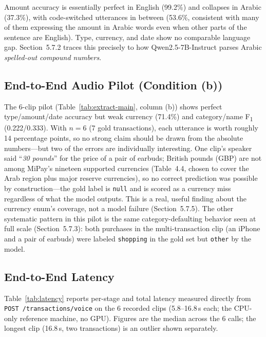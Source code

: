 Amount accuracy is essentially perfect in English (99.2\%) and collapses in
Arabic (37.3\%), with code-switched utterances in between (53.6\%, consistent
with many of them expressing the amount in Arabic words even when other parts
of the sentence are English). Type, currency, and date show no comparable
language gap. Section~5.7.2 traces this precisely to how Qwen2.5-7B-Instruct
parses Arabic \emph{spelled-out compound numbers}.

\subsection{End-to-End Audio Pilot (Condition (b))}

The 6-clip pilot (Table~\ref{tab:extract-main}, column (b)) shows perfect
type/amount/date accuracy but weak currency (71.4\%) and category/name
F\textsubscript{1} (0.222/0.333). With $n=6$ (7 gold transactions), each
utterance is worth roughly 14 percentage points, so no strong claim should be
drawn from the absolute numbers---but two of the errors are individually
interesting. One clip's speaker said ``\emph{30 pounds}'' for the price of a
pair of earbuds; British pounds (GBP) are not among MiPay's nineteen supported
currencies (Table~4.4, chosen to cover the Arab region plus major reserve
currencies), so no correct prediction was possible by construction---the gold
label is \texttt{null} and is scored as a currency miss regardless of what the
model outputs. This is a real, useful finding about the currency enum's
coverage, not a model failure (Section~5.7.5). The other systematic pattern in
this pilot is the same category-defaulting behavior seen at full scale
(Section~5.7.3): both purchases in the multi-transaction clip (an iPhone and a
pair of earbuds) were labeled \texttt{shopping} in the gold set but
\texttt{other} by the model.

\subsection{End-to-End Latency}

Table~\ref{tab:latency} reports per-stage and total latency measured directly
from \texttt{POST /transactions/voice} on the 6 recorded clips (5.8--16.8\,s
each; the CPU-only reference machine, no GPU). Figures are the median across
the 6 calls; the longest clip (16.8\,s, two transactions) is an outlier shown
separately.

